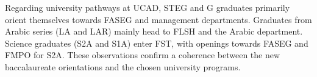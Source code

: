 \documentclass[a4paper,12pt]{report}                %
\begin{document}
    Regarding university pathways at UCAD, STEG and G graduates primarily orient themselves towards FASEG and management departments. Graduates from Arabic series (LA and LAR) mainly head to FLSH and the Arabic department. 
    Science graduates (S2A and S1A) enter FST, with openings towards FASEG and FMPO for S2A. 
    These observations confirm a coherence between the new baccalaureate orientations and the chosen university programs.

    \newpage
    \tableofcontents


    \newpage
    \listoffigures

    \lstlistoflistings
    
    \listoftables
    








     

    \printbibliography %
\end{document}
